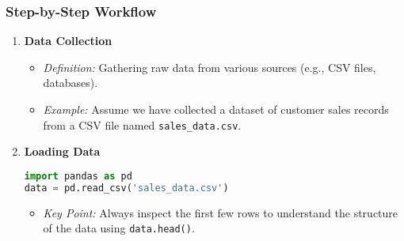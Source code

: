 \documentclass[aspectratio=169]{beamer}
\begin{document}
\begin{frame}[fragile]
    \frametitle{Step-by-Step Workflow}
    \begin{enumerate}
        \item \textbf{Data Collection}
        \begin{itemize}
            \item \textit{Definition:} Gathering raw data from various sources (e.g., CSV files, databases).
            \item \textit{Example:} Assume we have collected a dataset of customer sales records from a CSV file named \texttt{sales\_data.csv}.
        \end{itemize}
        
        \item \textbf{Loading Data}
        \begin{lstlisting}[language=Python]
import pandas as pd
data = pd.read_csv('sales_data.csv')
        \end{lstlisting}
        \begin{itemize}
            \item \textit{Key Point:} Always inspect the first few rows to understand the structure of the data using \texttt{data.head()}.
        \end{itemize}
    \end{enumerate}
\end{frame}
\end{document}
